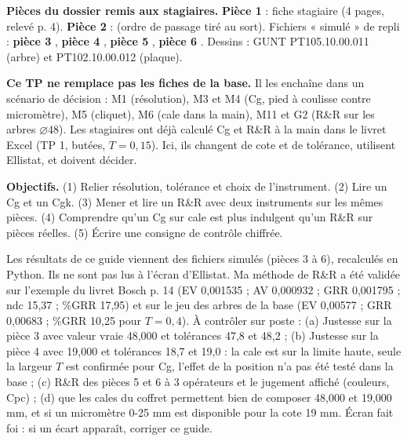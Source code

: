 \documentclass[10pt,a4paper]{article}
\begin{document}
\thispagestyle{fancy}

\begin{tcolorbox}[boite]
\textbf{Pièces du dossier remis aux stagiaires.} \textbf{Pièce 1} : fiche stagiaire (4 pages, relevé p. 4). \textbf{Pièce 2} :  (ordre de passage tiré au sort). Fichiers « simulé » de repli : \textbf{pièce 3} , \textbf{pièce 4} , \textbf{pièce 5} , \textbf{pièce 6} . Dessins : GUNT PT105.10.00.011 (arbre) et PT102.10.00.012 (plaque).\par
\textbf{Ce TP ne remplace pas les fiches de la base.} Il les enchaîne dans un scénario de décision : M1 (résolution), M3 et M4 (Cg, pied à coulisse contre micromètre), M5 (cliquet), M6 (cale dans la main), M11 et G2 (R\&R sur les arbres $\varnothing 48$). Les stagiaires ont déjà calculé Cg et R\&R à la main dans le livret Excel (TP 1, butées, $T = 0{,}15$). Ici, ils changent de cote et de tolérance, utilisent Ellistat, et doivent décider.\par
\textbf{Objectifs.} (1) Relier résolution, tolérance et choix de l'instrument. (2) Lire un Cg et un Cgk. (3) Mener et lire un R\&R avec deux instruments sur les mêmes pièces. (4) Comprendre qu'un Cg sur cale est plus indulgent qu'un R\&R sur pièces réelles. (5) Écrire une consigne de contrôle chiffrée.
\end{tcolorbox}

\begin{tcolorbox}[verif]
Les résultats de ce guide viennent des fichiers simulés (pièces 3 à 6), recalculés en Python. Ils ne sont pas lus à l'écran d'Ellistat. Ma méthode de R\&R a été validée sur l'exemple du livret Bosch p. 14 (EV 0,001535 ; AV 0,000932 ; GRR 0,001795 ; ndc 15,37 ; \%GRR 17,95) et sur le jeu des arbres de la base (EV 0,00577 ; GRR 0,00683 ; \%GRR 10,25 pour $T = 0{,}4$). À contrôler sur poste : (a) Justesse sur la pièce 3 avec valeur vraie 48,000 et tolérances 47,8 et 48,2 ; (b) Justesse sur la pièce 4 avec 19,000 et tolérances 18,7 et 19,0 : la cale est sur la limite haute, seule la largeur $T$ est confirmée pour Cg, l'effet de la position n'a pas été testé dans la base ; (c) R\&R des pièces 5 et 6 à 3 opérateurs et le jugement affiché (couleurs, Cpc) ; (d) que les cales du coffret permettent bien de composer 48,000 et 19,000 mm, et si un micromètre 0-25 mm est disponible pour la cote 19 mm. Écran fait foi : si un écart apparaît, corriger ce guide.
\end{tcolorbox}
\end{document}

